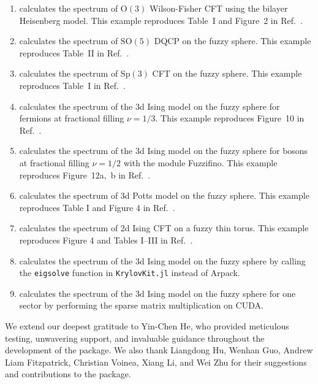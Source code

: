 \documentclass{timesjhep}
\begin{document}
\begin{enumerate}
    \item {} calculates the spectrum of $\mathrm{O}(3)$ Wilson-Fisher CFT using the bilayer Heisenberg model. This example reproduces Table~I and Figure~2 in Ref.~\cite{Han2023Dec}.
    \item {} calculates the spectrum of $\mathrm{SO}(5)$ DQCP on the fuzzy sphere. This example reproduces Table~II in Ref.~\cite{Zhou2023}.
    \item {} calculates the spectrum of $\mathrm{Sp}(3)$ CFT on the fuzzy sphere. This example reproduces Table~I in Ref.~\cite{Zhou2024Oct}.
    \item {} calculates the spectrum of the 3d Ising model on the fuzzy sphere for fermions at fractional filling $\nu = 1/3$. This example reproduces Figure~10 in Ref.~\cite{Voinea2024}.
    \item {} calculates the spectrum of the 3d Ising model on the fuzzy sphere for bosons at fractional filling $\nu = 1/2$ with the module Fuzzifino. This example reproduces Figure~12a,~b in Ref.~\cite{Voinea2024}.
    \item {} calculates the spectrum of 3d Potts model on the fuzzy sphere. This example reproduces Table I and Figure 4 in Ref.~\cite{Yang2025}.
    \item {} calculates the spectrum of 2d Ising CFT on a fuzzy thin torus. This example reproduces Figure 4 and Tables I--III in Ref.~\cite{Han2025}.
    \item {} calculates the spectrum of the 3d Ising model on the fuzzy sphere by calling the \lstinline|eigsolve| function in \lstinline|KrylovKit.jl| instead of Arpack.
    \item {} calculates the spectrum of the 3d Ising model on the fuzzy sphere for one sector by performing the sparse matrix multiplication on CUDA.
\end{enumerate}

\clearpage
\acknowledgments

We extend our deepest gratitude to Yin-Chen He, who provided meticulous testing, unwavering support, and invaluable guidance throughout the development of the package. We also thank Liangdong Hu, Wenhan Guo, Andrew Liam Fitzpatrick, Christian Voinea, Xiang Li, and Wei Zhu for their suggestions and contributions to the package.
\end{document}
